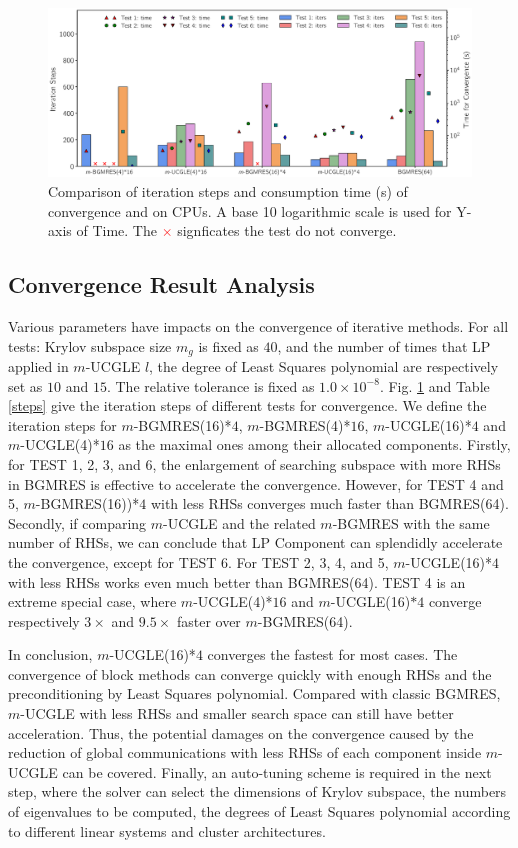 \begin{figure}[t]
	\centering
	\includegraphics[width=.99\linewidth]{fig/iteration_time2.eps}
	\caption{Comparison of iteration steps and consumption time (s) of convergence and on CPUs. A base 10 logarithmic scale is used for Y-axis of Time. The \textcolor{red}{$\times$} signficates the test do not converge.}
	\label{fig:iteration}
\end{figure}

\subsection{Convergence Result Analysis}

Various parameters have impacts on the convergence of iterative methods. For all tests: Krylov subspace size $m_g$ is fixed as $40$, and the number of times that LP applied in $m$-UCGLE $l$, the degree of Least Squares polynomial are respectively set as $10$ and $15$. The relative tolerance is fixed as $1.0 \times 10^{-8}$. Fig. \ref{fig:iteration} and Table \ref{steps} give the iteration steps of different tests for convergence. We define the iteration steps for $m$-BGMRES(16)*$4$, $m$-BGMRES(4)*$16$,  $m$-UCGLE(16)*$4$ and $m$-UCGLE(4)*$16$ as the maximal ones among their allocated components.  Firstly, for TEST 1, 2, 3, and 6, the enlargement of searching subspace with more RHSs in BGMRES is effective to accelerate the convergence. However, for TEST 4 and 5, $m$-BGMRES(16))*$4$ with less RHSs converges much faster than BGMRES(64). Secondly, if comparing $m$-UCGLE and the related $m$-BGMRES with the same number of RHSs, we can conclude that LP Component can splendidly accelerate the convergence, except for TEST 6.  For TEST 2, 3, 4, and 5, $m$-UCGLE(16)*$4$  with less RHSs works even much better than BGMRES(64). TEST 4  is an extreme special case, where $m$-UCGLE(4)*$16$ and $m$-UCGLE(16)$*4$ converge respectively $3\times$ and $9.5 \times$ faster over $m$-BGMRES(64).  

In conclusion, $m$-UCGLE(16)*$4$ converges the fastest for most cases. The convergence of block methods can converge quickly with enough RHSs and the preconditioning by Least Squares polynomial. Compared with classic BGMRES, $m$-UCGLE with less RHSs and smaller search space can still have better acceleration. Thus, the potential damages on the convergence caused by the reduction of global communications with less RHSs of each component inside $m$-UCGLE can be covered. Finally, an auto-tuning scheme is required in the next step, where the solver can select the dimensions of Krylov subspace, the numbers of eigenvalues to be computed, the degrees of Least Squares polynomial according to different linear systems and cluster architectures.


